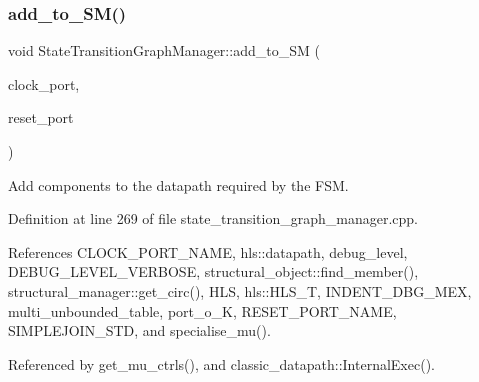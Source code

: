 \subsubsection{\texorpdfstring{add\+\_\+to\+\_\+\+S\+M()}{add\_to\_SM()}}
{\footnotesize\ttfamily void State\+Transition\+Graph\+Manager\+::add\+\_\+to\+\_\+\+SM (\begin{DoxyParamCaption}\item[{\hyperlink{structural__objects_8hpp_a8ea5f8cc50ab8f4c31e2751074ff60b2}{structural\+\_\+object\+Ref}}]{clock\+\_\+port,  }\item[{\hyperlink{structural__objects_8hpp_a8ea5f8cc50ab8f4c31e2751074ff60b2}{structural\+\_\+object\+Ref}}]{reset\+\_\+port }\end{DoxyParamCaption})}



Add components to the datapath required by the F\+SM. 



Definition at line 269 of file state\+\_\+transition\+\_\+graph\+\_\+manager.\+cpp.



References C\+L\+O\+C\+K\+\_\+\+P\+O\+R\+T\+\_\+\+N\+A\+ME, hls\+::datapath, debug\+\_\+level, D\+E\+B\+U\+G\+\_\+\+L\+E\+V\+E\+L\+\_\+\+V\+E\+R\+B\+O\+SE, structural\+\_\+object\+::find\+\_\+member(), structural\+\_\+manager\+::get\+\_\+circ(), H\+LS, hls\+::\+H\+L\+S\+\_\+T, I\+N\+D\+E\+N\+T\+\_\+\+D\+B\+G\+\_\+\+M\+EX, multi\+\_\+unbounded\+\_\+table, port\+\_\+o\+\_\+K, R\+E\+S\+E\+T\+\_\+\+P\+O\+R\+T\+\_\+\+N\+A\+ME, S\+I\+M\+P\+L\+E\+J\+O\+I\+N\+\_\+\+S\+TD, and specialise\+\_\+mu().



Referenced by get\+\_\+mu\+\_\+ctrls(), and classic\+\_\+datapath\+::\+Internal\+Exec().

